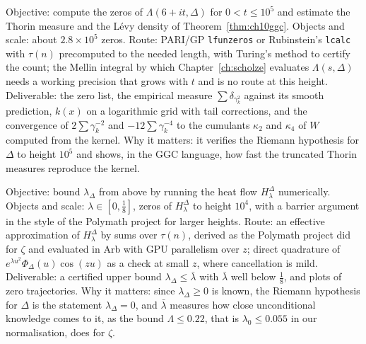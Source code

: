 \begin{compproblem}
Objective: compute the zeros of $\Lambda(6+it,\Delta)$ for $0<t\le10^5$ and estimate the Thorin measure and the L\'evy density of Theorem~\ref{thm:ch10ggc}. Objects and scale: about $2.8\times10^5$ zeros. Route: PARI/GP \texttt{lfunzeros} or Rubinstein's \texttt{lcalc} with $\tau(n)$ precomputed to the needed length, with Turing's method to certify the count; the Mellin integral by which Chapter~\ref{ch:scholze} evaluates $\Lambda(s,\Delta)$ needs a working precision that grows with $t$ and is no route at this height. Deliverable: the zero list, the empirical measure $\sum\delta_{\gamma_k^2}$ against its smooth prediction, $k(x)$ on a logarithmic grid with tail corrections, and the convergence of $2\sum\gamma_k^{-2}$ and $-12\sum\gamma_k^{-4}$ to the cumulants $\kappa_2$ and $\kappa_4$ of $W$ computed from the kernel. Why it matters: it verifies the Riemann hypothesis for $\Delta$ to height $10^5$ and shows, in the GGC language, how fast the truncated Thorin measures reproduce the kernel.
\end{compproblem}

\begin{compproblem}
Objective: bound $\lambda_\Delta$ from above by running the heat flow $H^\Delta_\lambda$ numerically. Objects and scale: $\lambda\in[0,\frac18]$, zeros of $H^\Delta_\lambda$ to height $10^4$, with a barrier argument in the style of the Polymath project for larger heights. Route: an effective approximation of $H^\Delta_\lambda$ by sums over $\tau(n)$, derived as the Polymath project did for $\zeta$ and evaluated in Arb with GPU parallelism over $z$; direct quadrature of $e^{\lambda u^2}\Phi_\Delta(u)\cos(zu)$ as a check at small $z$, where cancellation is mild. Deliverable: a certified upper bound $\lambda_\Delta\le\bar\lambda$ with $\bar\lambda$ well below $\frac18$, and plots of zero trajectories. Why it matters: since $\lambda_\Delta\ge0$ is known, the Riemann hypothesis for $\Delta$ is the statement $\lambda_\Delta=0$, and $\bar\lambda$ measures how close unconditional knowledge comes to it, as the bound $\Lambda\le0.22$, that is $\lambda_0\le0.055$ in our normalisation, does for $\zeta$.
\end{compproblem}

